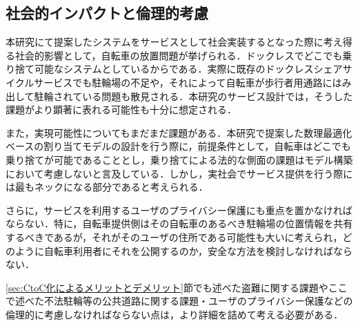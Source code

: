   \subsection{社会的インパクトと倫理的考慮}
    \label{sec:社会的インパクトと倫理的考慮}
      \par 本研究にて提案したシステムをサービスとして社会実装するとなった際に考え得る社会的影響として，自転車の放置問題が挙げられる．ドックレスでどこでも乗り捨て可能なシステムとしているからである．実際に既存のドックレスシェアサイクルサービスでも駐輪場の不足や，それによって自転車が歩行者用通路にはみ出して駐輪されている問題も散見される．本研究のサービス設計では，そうした課題がより顕著に表れる可能性も十分に想定される．
      \par また，実現可能性についてもまだまだ課題がある．本研究で提案した数理最適化ベースの割り当てモデルの設計を行う際に，前提条件として，自転車はどこでも乗り捨てが可能であることとし，乗り捨てによる法的な側面の課題はモデル構築において考慮しないと言及している．しかし，実社会でサービス提供を行う際には最もネックになる部分であると考えられる．
      \par さらに，サービスを利用するユーザのプライバシー保護にも重点を置かなければならない．特に，自転車提供側はその自転車のあるべき駐輪場の位置情報を共有するべきであるが，それがそのユーザの住所である可能性も大いに考えられ，どのように自転車利用者にそれを公開するのか，安全な方法を検討しなければならない．
      \par \ref{sec:CtoC化によるメリットとデメリット}節でも述べた盗難に関する課題やここで述べた不法駐輪等の公共道路に関する課題・ユーザのプライバシー保護などの倫理的に考慮しなければならない点は，より詳細を詰めて考える必要がある．
